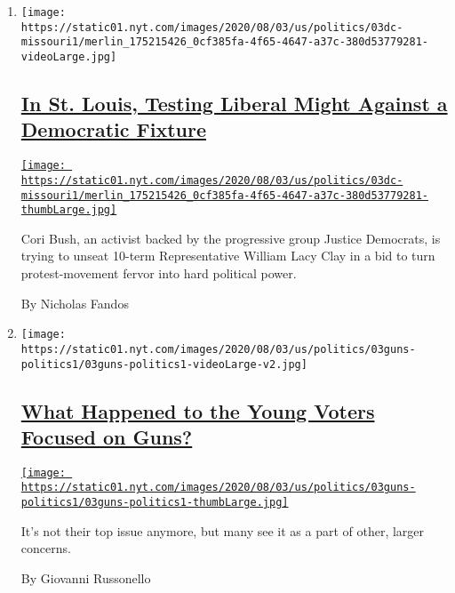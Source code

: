 \begin{enumerate}
\def\labelenumi{\arabic{enumi}.}
\item
  \texttt{[image: https://static01.nyt.com/images/2020/08/03/us/politics/03dc-missouri1/merlin\_175215426\_0cf385fa-4f65-4647-a37c-380d53779281-videoLarge.jpg]}

  \hypertarget{in-st-louis-testing-liberal-might-against-a-democratic-fixture}{%
  \subsection{\texorpdfstring{\href{/2020/08/02/us/politics/cori-bush-william-lacy-clay-missouri.html}{In
  St. Louis, Testing Liberal Might Against a Democratic
  Fixture}}{In St. Louis, Testing Liberal Might Against a Democratic Fixture}}\label{in-st-louis-testing-liberal-might-against-a-democratic-fixture}}

  \href{/2020/08/02/us/politics/cori-bush-william-lacy-clay-missouri.html}{\texttt{[image: https://static01.nyt.com/images/2020/08/03/us/politics/03dc-missouri1/merlin\_175215426\_0cf385fa-4f65-4647-a37c-380d53779281-thumbLarge.jpg]}}

  Cori Bush, an activist backed by the progressive group Justice
  Democrats, is trying to unseat 10-term Representative William Lacy
  Clay in a bid to turn protest-movement fervor into hard political
  power.

  By Nicholas Fandos
\item
  \texttt{[image: https://static01.nyt.com/images/2020/08/03/us/politics/03guns-politics1/03guns-politics1-videoLarge-v2.jpg]}

  \hypertarget{what-happened-to-the-young-voters-focused-on-guns}{%
  \subsection{\texorpdfstring{\href{/2020/08/03/us/politics/gun-control-voters.html}{What
  Happened to the Young Voters Focused on
  Guns?}}{What Happened to the Young Voters Focused on Guns?}}\label{what-happened-to-the-young-voters-focused-on-guns}}

  \href{/2020/08/03/us/politics/gun-control-voters.html}{\texttt{[image: https://static01.nyt.com/images/2020/08/03/us/politics/03guns-politics1/03guns-politics1-thumbLarge.jpg]}}

  It's not their top issue anymore, but many see it as a part of other,
  larger concerns.

  By Giovanni Russonello
\end{enumerate}

